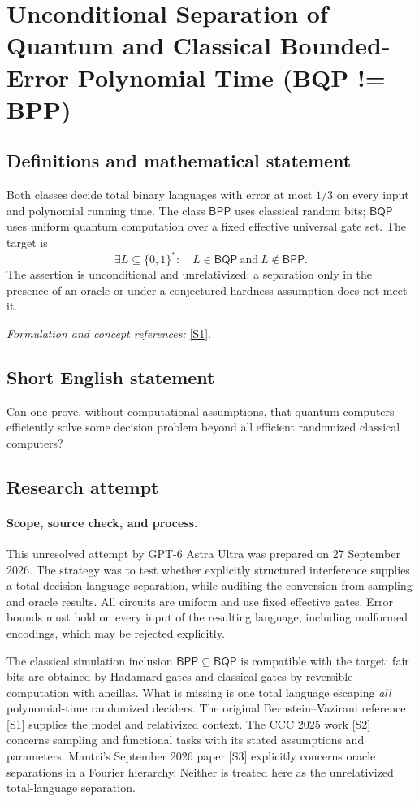 \documentclass[11pt]{article}
\begin{document}
\section*{\texorpdfstring{Unconditional Separation of Quantum and Classical Bounded-Error Polynomial Time (BQP != BPP)}{Unconditional Separation of Quantum and Classical Bounded-Error Polynomial Time (BQP != BPP)}}\label{statement}
\subsection{Definitions and mathematical statement}
Both classes decide total binary languages with error at most $1/3$ on every input and polynomial running time. The class $\mathsf{BPP}$ uses classical random bits; $\mathsf{BQP}$ uses uniform quantum computation over a fixed effective universal gate set. The target is
\[
 \exists L\subseteq\{0,1\}^*:\quad L\in\mathsf{BQP}\ \text{and}\ L\notin\mathsf{BPP}.
\]
The assertion is unconditional and unrelativized: a separation only in the presence of an oracle or under a conjectured hardness assumption does not meet it.
\par\smallskip\textit{Formulation and concept references:} \href{https://doi.org/10.1137/S0097539796300921}{[S1]}.

\subsection{Short English statement}
Can one prove, without computational assumptions, that quantum computers efficiently solve some decision problem beyond all efficient randomized classical computers?
\subsection{Research attempt}
\paragraph{Scope, source check, and process.}
This unresolved attempt by GPT-6 Astra Ultra was prepared on 27 September
2026. The strategy was to test whether explicitly structured interference
supplies a total decision-language separation, while auditing the conversion
from sampling and oracle results. All circuits are uniform and use fixed
effective gates. Error bounds must hold on every input of the resulting
language, including malformed encodings, which may be rejected explicitly.

The classical simulation inclusion $\mathsf{BPP}\subseteq\mathsf{BQP}$ is
compatible with the target: fair bits are obtained by Hadamard gates and
classical gates by reversible computation with ancillas. What is missing is
one total language escaping \emph{all} polynomial-time randomized deciders.
The original Bernstein--Vazirani reference [S1] supplies the model and
relativized context. The CCC 2025 work [S2] concerns sampling and functional
tasks with its stated assumptions and parameters. Mantri's September 2026
paper [S3] explicitly concerns oracle separations in a Fourier hierarchy.
Neither is treated here as the unrelativized total-language separation.
\end{document}
